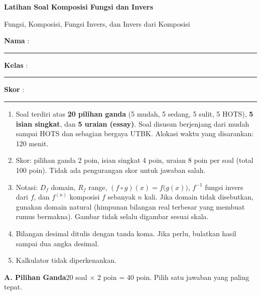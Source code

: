 \documentclass[a4paper,11pt]{article}
\newcounter{no}
\newcommand{\bagian}[2]{\par\Needspace{6\baselineskip}\vspace{1.0em}\noindent
  \begin{tcolorbox}[colback=redx,colframe=redx,coltext=white,boxrule=0pt,arc=2pt,left=6pt,right=6pt,top=3pt,bottom=3pt]
  \textbf{#1}\hfill{\small #2}\end{tcolorbox}\setcounter{no}{0}\par\vspace{-0.3em}}
\begin{document}
\thispagestyle{fancy}

\begin{center}
  {\color{redx}\fontsize{22}{26}\selectfont\bfseries Latihan Soal Komposisi Fungsi dan Invers\par}
  \vspace{2pt}
  {\color{pinkx}\large Fungsi, Komposisi, Fungsi Invers, dan Invers dari Komposisi\par}
\end{center}
\vspace{2pt}
\begin{tcolorbox}[colback=softbg,colframe=redx!40,boxrule=0.6pt,arc=3pt,left=8pt,right=8pt,top=5pt,bottom=5pt]
\noindent\textbf{Nama} : \rule{4.6cm}{0.4pt}\hfill\textbf{Kelas} : \rule{2.2cm}{0.4pt}\hfill\textbf{Skor} : \rule{2.2cm}{0.4pt}
\end{tcolorbox}
\vspace{2pt}
\begin{tcolorbox}[colback=white,colframe=pinkx,boxrule=0.8pt,arc=3pt,left=8pt,right=8pt,top=4pt,bottom=4pt,title={\bfseries Petunjuk Pengerjaan},coltitle=white,fonttitle=\small]
\small
\begin{enumerate}[leftmargin=1.4em,itemsep=1pt,topsep=1pt]
\item Soal terdiri atas \textbf{20 pilihan ganda} (5 mudah, 5 sedang, 5 sulit, 5 HOTS), \textbf{5 isian singkat}, dan \textbf{5 uraian (essay)}. Soal disusun berjenjang dari mudah sampai HOTS dan sebagian bergaya UTBK. Alokasi waktu yang disarankan: 120 menit.
\item Skor: pilihan ganda 2 poin, isian singkat 4 poin, uraian 8 poin per soal (total 100 poin). Tidak ada pengurangan skor untuk jawaban salah.
\item Notasi: $D_f$ domain, $R_f$ range, $(f\circ g)(x)=f\big(g(x)\big)$, $f^{-1}$ fungsi invers dari $f$, dan $f^{(n)}$ komposisi $f$ sebanyak $n$ kali. Jika domain tidak disebutkan, gunakan domain natural (himpunan bilangan real terbesar yang membuat rumus bermakna). Gambar tidak selalu digambar sesuai skala.
\item Bilangan desimal ditulis dengan tanda koma. Jika perlu, bulatkan hasil sampai dua angka desimal.
\item Kalkulator tidak diperkenankan.
\end{enumerate}
\end{tcolorbox}

\bagian{A. Pilihan Ganda}{20 soal $\times$ 2 poin = 40 poin. Pilih satu jawaban yang paling tepat.}
\end{document}
